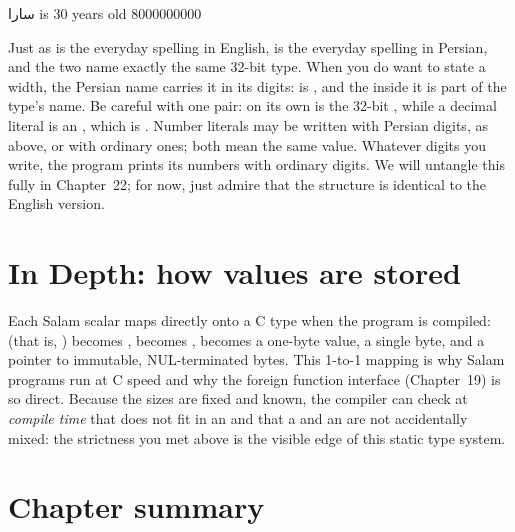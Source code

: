 \begin{progout}
سارا is 30 years old
8000000000
\end{progout}

Just as  is the everyday spelling in English,  is the
everyday spelling in Persian, and the two name exactly the same 32-bit type. When
you do want to state a width, the Persian name carries it in its digits:
 is , and the  inside it is part of the
type's name. Be careful with one pair:  on its own is the
32-bit , while a decimal literal is an , which is
. Number literals may be written with Persian digits, as
above, or with ordinary ones; both mean the same value. Whatever digits you
write, the program prints its numbers with ordinary digits. We will untangle
this fully in Chapter~22; for now, just admire that the structure is identical
to the English version.

\section{In Depth: how values are stored}

\begin{deep}
Each Salam scalar maps directly onto a C type when the program is compiled:
 (that is, ) becomes ,  becomes
,
 becomes a one-byte value,  a single byte, and 
a pointer to immutable, NUL-terminated bytes. This 1-to-1 mapping is why Salam
programs run at C speed and why the foreign function interface (Chapter~19) is
so direct. Because the sizes are fixed and known, the compiler can check at
\emph{compile time} that  does not fit in an  and that a
 and an  are not accidentally mixed: the strictness you met
above is the visible edge of this static type system.
\end{deep}

\section{Chapter summary}

